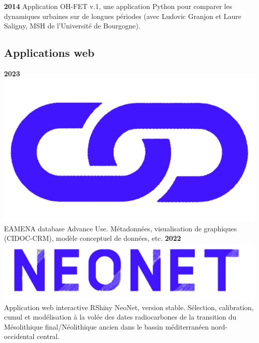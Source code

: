 \documentclass{article}
\begin{document}
\smallbreak
\textbf{2014 }Application \textsf{OH-FET} v.1, une application \textsf{Python} pour comparer les dynamiques urbaines sur de longues périodes (avec Ludovic Granjon et Laure Saligny, MSH de l'Université de Bourgogne).

\subsection*{Applications web}
\textbf{2023 }\href{https://eamena.org/advanced-use}{\includegraphics[scale=0.02]{link_darkblue.png}} EAMENA database Advance Use. Métadonnées, visualisation de graphiques (CIDOC-CRM), modèle conceptuel de données, etc.
\smallbreak
\textbf{2022 }\href{http://shinyserver.cfs.unipi.it:3838/C14/}{\includegraphics[scale=0.03]{prj_neonet-blue.png}} Application web interactive \textsf{RShiny} NeoNet, version stable. Sélection, calibration, cumul et modélisation à la volée des dates radiocarbones de la transition du Mésolithique final/Néolithique ancien dans le bassin méditerranéen nord-occidental central.
\smallbreak
\end{document}
